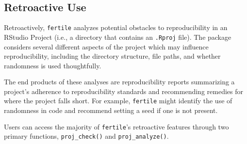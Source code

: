 \documentclass[12pt,twoside]{reedthesis}
\begin{document}
\subsection{Retroactive Use}\label{retroactive-use}

Retroactively, \texttt{fertile} analyzes potential obstacles to
reproducibility in an RStudio Project (i.e., a directory that contains
an \texttt{.Rproj} file). The package considers several different
aspects of the project which may influence reproducibility, including
the directory structure, file paths, and whether randomness is used
thoughtfully.

The end products of these analyses are reproducibility reports
summarizing a project's adherence to reproducibility standards and
recommending remedies for where the project falls short. For example,
\texttt{fertile} might identify the use of randomness in code and
recommend setting a seed if one is not present.

Users can access the majority of \texttt{fertile}'s retroactive features
through two primary functions, \texttt{proj\_check()} and
\texttt{proj\_analyze()}.
\end{document}
